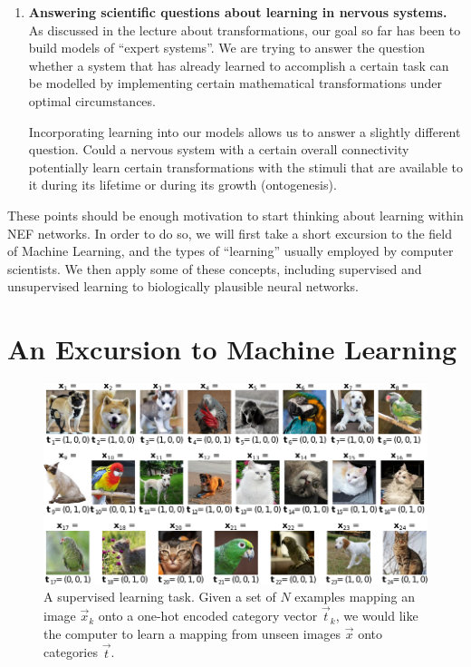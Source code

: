 \documentclass[10pt,letterpaper,oneside]{article}
\begin{document}
\begin{enumerate}[1.]
	\item \textbf{Answering scientific questions about learning in nervous systems.}\\
	As discussed in the lecture about transformations, our goal so far has been to build models of \enquote{expert systems}. We are trying to answer the question whether a system that has already learned to accomplish a certain task can be modelled by implementing certain mathematical transformations under optimal circumstances.

	Incorporating learning into our models allows us to answer a slightly different question. Could a nervous system with a certain overall connectivity potentially learn certain transformations with the stimuli that are available to it during its lifetime or during its growth (ontogenesis).
\end{enumerate}

These points should be enough motivation to start thinking about learning within NEF networks. In order to do so, we will first take a short excursion to the field of Machine Learning, and the types of \enquote{learning} usually employed by computer scientists. We then apply some of these concepts, including supervised and unsupervised learning to biologically plausible neural networks.

\section{An Excursion to Machine Learning}

\begin{figure}
	\centering
	\includegraphics{media/learning_example_supervised.pdf}
	\caption{A supervised learning task. Given a set of $N$ examples mapping an image $\vec x_k$ onto a one-hot encoded category vector $\vec t_k$, we would like the computer to learn a mapping from unseen images $\vec x$ onto categories $\vec t$.}
	\label{fig:learning_example_supervised}
\end{figure}
\end{document}
